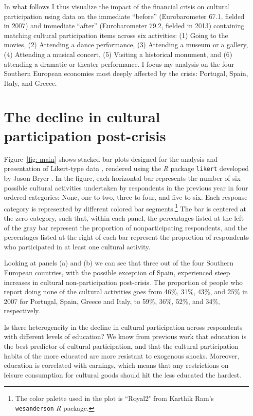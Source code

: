 \documentclass{article}
\begin{document}
In what follows I thus visualize the impact of the financial crisis on cultural participation using data on the immediate ``before'' (Eurobarometer 67.1, fielded in 2007) and immediate ``after'' (Eurobarometer 79.2, fielded in 2013) containing matching cultural participation items across six activities: (1) Going to the movies, (2) Attending a dance performance, (3) Attending a museum or a gallery, (4) Attending a musical concert, (5) Visiting a historical monument, and (6) attending a dramatic or theater performance. I focus my analysis on the four Southern European economies most deeply affected by the crisis: Portugal, Spain, Italy, and Greece. 

\section{The decline in cultural participation post-crisis}
Figure~\ref{fig: main} shows stacked bar plots designed for the analysis and presentation of Likert-type data \citep{heiberger2014design}, rendered using the {\em} {\em R} package \texttt{likert} developed by Jason Bryer \citeyearpar{bryer-likert}. In the figure, each horizontal bar represents the number of six possible cultural activities undertaken by respondents in the previous year in four ordered categories: None, one to two, three to four, and five to six. Each response category is represented by different colored bar segments.\footnote{The color palette used in the plot is ``Royal2" from Karthik Ram's \citeyearpar{Ram_wespalette} \texttt{wesanderson} {\em R} package.} The bar is centered at the zero category, such that, within each panel, the percentages listed at the left of the gray bar represent the proportion of nonparticipating respondents, and the percentages listed at the right of each bar represent the proportion of respondents who participated in at least one cultural activity. 

Looking at panels (a) and (b) we can see that three out of the four Southern European countries, with the possible exception of Spain, experienced steep increases in cultural non-participation post-crisis. The proportion of people who report doing none of the cultural activities goes from 46\%, 31\%, 43\%, and 25\% in 2007 for Portugal, Spain, Greece and Italy, to 59\%, 36\%, 52\%, and 34\%, respectively. 

Is there heterogeneity in the decline in cultural participation across respondents with different levels of education? We know from previous work that education is the best predictor of cultural participation, and that the cultural participation habits of the more educated are more resistant to exogenous shocks. Moreover, education is correlated with earnings, which means that any restrictions on leisure consumption for cultural goods should hit the less educated the hardest. 
\end{document}
